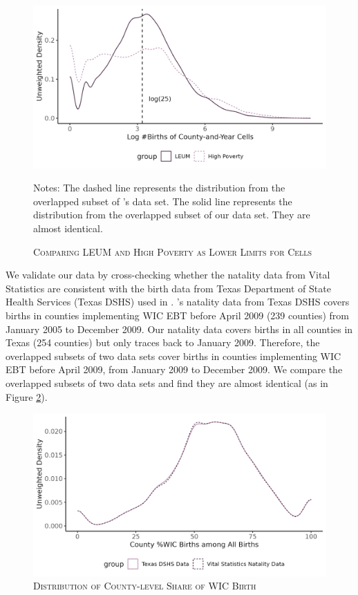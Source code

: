 \begin{figure}
	\begin{center}
		\includegraphics[width=.8\textwidth]{leum_hp.png}  
		\caption{\textsc{Comparing LEUM and High Poverty as Lower Limits for Cells}}
		\label{proxy}
	\end{center}
	\footnotesize
	Notes: The dashed line represents the distribution from the overlapped subset of \cite{meckel2020cure}'s data set. The solid line represents the distribution from the overlapped subset of our data set. They are almost identical.
\end{figure}

We validate our data by cross-checking whether the natality data from Vital Statistics are consistent with the birth data from Texas Department of State Health Services (Texas DSHS) used in \cite{meckel2020cure}. \cite{meckel2020cure}'s natality data from Texas DSHS covers births in counties implementing WIC EBT before April 2009 (239 counties) from January 2005 to December 2009. Our natality data covers births in all counties in Texas (254 counties) but only traces back to January 2009. Therefore, the overlapped subsets of two data sets cover births in counties implementing WIC EBT before April 2009, from January 2009 to December 2009. We compare the overlapped subsets of two data sets and find they are almost identical (as in Figure \ref{check}). 

\begin{figure}
	\begin{center}
		\includegraphics[width=.8\textwidth]{density_wic_rate.png}  
		\caption{\textsc{Distribution of County-level Share of WIC Birth}}
		\label{check}
	\end{center}
	\footnotesize
\end{figure}

